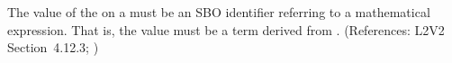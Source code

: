 The value of the   on a \Constraint must be an SBO
identifier referring to a mathematical expression.  That is, the value must
be a term derived from \sbomathformula.  (References: L2V2 Section~4.12.3;
)
